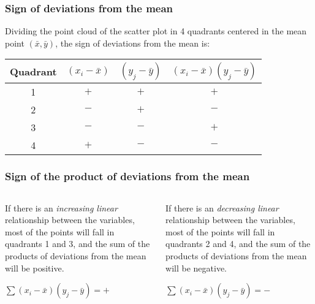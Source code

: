 \begin{frame}
\frametitle{Sign of deviations from the mean}
Dividing the point cloud of the scatter plot in 4 quadrants centered in the mean point $(\bar x, \bar y)$, the sign of
deviations from the mean is:
\begin{center}
\resizebox*{!}{0.5\textheight}{}
\begin{tabular}{cccc}
Quadrant & $(x_i-\bar x)$ & $(y_j-\bar y)$ & $(x_i-\bar x)(y_j-\bar y)$\\
\hline
1 & $+$ & $+$ & \alert{$+$}\\
2 & $-$ & $+$ & \alert{$-$}\\
3 & $-$ & $-$ & \alert{$+$}\\
4 & $+$ & $-$ & \alert{$-$}\\
\hline
\end{tabular}
\end{center}
\end{frame}


\begin{frame}
\frametitle{Sign of the product of deviations from the mean}
\begin{columns}
\begin{column}{0.5\textwidth}
If there is an \emph{increasing linear} relationship between the variables, most of the points will fall in quadrants 1
and 3, and the sum of the products of deviations from the mean will be positive.

\centering
\resizebox{0.9\textwidth}{!}{}

$\sum(x_i-\bar x)(y_j-\bar y) = +$
\end{column}
\begin{column}{0.5\textwidth}
If there is an \emph{decreasing linear} relationship between the variables, most of the points will fall in quadrants 2
and 4, and the sum of the products of deviations from the mean will be negative.

\centering
\resizebox{0.9\textwidth}{!}{}

$\sum(x_i-\bar x)(y_j-\bar y) = -$
\end{column}
\end{columns}
\end{frame}



